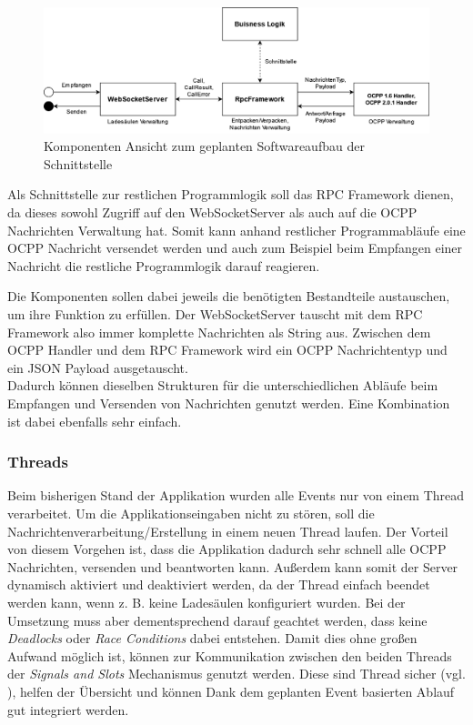 \begin{figure}[H]
	\centering
	\includegraphics[width=1.0\textwidth]{images/Architektur/Zusammenhang_Module.png}
	\caption{Komponenten Ansicht zum geplanten Softwareaufbau der Schnittstelle\cite{Eigene_Darstellung}}
	\label{fig:Komponenten_Aufbau}
\end{figure}

\noindent Als Schnittstelle zur restlichen Programmlogik soll das RPC Framework dienen, da dieses sowohl Zugriff auf den WebSocketServer als auch auf die OCPP Nachrichten Verwaltung hat. Somit kann anhand restlicher Programmabläufe eine OCPP Nachricht versendet werden und auch zum Beispiel beim Empfangen einer Nachricht die restliche Programmlogik darauf reagieren.

\noindent Die Komponenten sollen dabei jeweils die benötigten Bestandteile austauschen, um ihre Funktion zu erfüllen. Der WebSocketServer tauscht mit dem RPC Framework also immer komplette Nachrichten als String aus. Zwischen dem OCPP Handler und dem RPC Framework wird ein OCPP Nachrichtentyp und ein JSON Payload ausgetauscht. \\
\noindent Dadurch können dieselben Strukturen für die unterschiedlichen Abläufe beim Empfangen und Versenden von Nachrichten genutzt werden. Eine Kombination ist dabei ebenfalls sehr einfach. 

\subsubsection{Threads}
Beim bisherigen Stand der Applikation wurden alle Events nur von einem Thread verarbeitet. Um die Applikationseingaben nicht zu stören, soll die Nachrichtenverarbeitung/Erstellung in einem neuen Thread laufen. Der Vorteil von diesem Vorgehen ist, dass die Applikation dadurch sehr schnell alle OCPP Nachrichten, versenden und beantworten kann. Außerdem kann somit der Server dynamisch aktiviert und deaktiviert werden, da der Thread einfach beendet werden kann, wenn z. B. keine Ladesäulen konfiguriert wurden. Bei der Umsetzung muss aber dementsprechend darauf geachtet werden, dass keine \textit{Deadlocks} oder \textit{Race Conditions} dabei entstehen. Damit dies ohne großen Aufwand möglich ist, können zur Kommunikation zwischen den beiden Threads der \textit{Signals and Slots} Mechanismus genutzt werden. Diese sind Thread sicher (vgl. \cite{Qt-signals-and-slots}), helfen der Übersicht und können Dank dem geplanten Event basierten Ablauf gut integriert werden.
